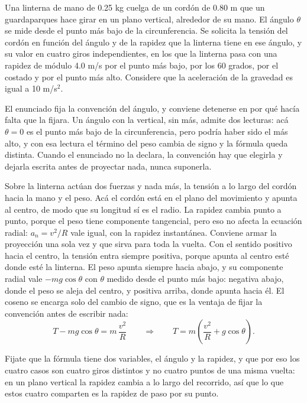 \documentclass[11pt,openany]{book}
\begin{document}
\begin{ejemplo}[parcial]
Una linterna de mano de 0.25 kg cuelga de un cordón de 0.80 m que un guardaparques hace girar en un plano vertical, alrededor de su mano. El ángulo $\theta$ se mide desde el punto más bajo de la circunferencia. Se solicita la tensión del cordón en función del ángulo y de la rapidez que la linterna tiene en ese ángulo, y su valor en cuatro giros independientes, en los que la linterna pasa con una rapidez de módulo 4.0 m/s por el punto más bajo, por los 60 grados, por el costado y por el punto más alto. Considere que la aceleración de la gravedad es igual a 10 m/s$^2$.

El enunciado fija la convención del ángulo, y conviene detenerse en por qué hacía falta que la fijara. Un ángulo con la vertical, sin más, admite dos lecturas: acá $\theta = 0$ es el punto más bajo de la circunferencia, pero podría haber sido el más alto, y con esa lectura el término del peso cambia de signo y la fórmula queda distinta. Cuando el enunciado no la declara, la convención hay que elegirla y dejarla escrita antes de proyectar nada, nunca suponerla.

Sobre la linterna actúan dos fuerzas y nada más, la tensión a lo largo del cordón hacia la mano y el peso. Acá el cordón está en el plano del movimiento y apunta al centro, de modo que su longitud sí es el radio. La rapidez cambia punto a punto, porque el peso tiene componente tangencial, pero eso no afecta la ecuación radial: $a_n = v^2/R$ vale igual, con la rapidez instantánea. Conviene armar la proyección una sola vez y que sirva para toda la vuelta. Con el sentido positivo hacia el centro, la tensión entra siempre positiva, porque apunta al centro esté donde esté la linterna. El peso apunta siempre hacia abajo, y su componente radial vale $-mg\cos\theta$ con $\theta$ medido desde el punto más bajo: negativa abajo, donde el peso se aleja del centro, y positiva arriba, donde apunta hacia él. El coseno se encarga solo del cambio de signo, que es la ventaja de fijar la convención antes de escribir nada:
\[
T - mg\cos\theta = m\,\frac{v^2}{R}
\qquad\Longrightarrow\qquad
T = m\left(\frac{v^2}{R} + g\cos\theta\right) .
\]

Fijate que la fórmula tiene dos variables, el ángulo y la rapidez, y que por eso los cuatro casos son cuatro giros distintos y no cuatro puntos de una misma vuelta: en un plano vertical la rapidez cambia a lo largo del recorrido, así que lo que estos cuatro comparten es la rapidez de paso por su punto.


\end{ejemplo}
\end{document}
